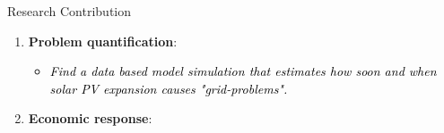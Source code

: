 \documentclass[10pt, aspectration=169]{beamer}
\begin{document}
\begin{frame}{}
\begin{block}{Research Contribution}
    \begin{enumerate}
        \item \textbf{Problem quantification}: 
        \begin{itemize}
            \item \textcolor{black}{\textit{Find a data based model simulation that estimates how soon and when solar PV expansion causes "grid-problems".}}
        \end{itemize}
        \vspace{0.1cm}
        \item \textbf{Economic response}: 
        \begin{itemize}

\end{itemize}
\end{enumerate}
\end{block}
\end{frame}
\end{document}
